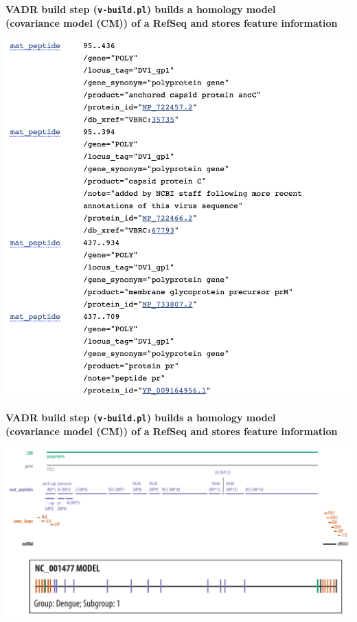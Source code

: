 \documentclass[landscape]{slides}
\begin{document}
\begin{slide}
\begin{center}
\textbf{VADR build step (\texttt{v-build.pl}) builds a homology model
  \\ (covariance model (CM)) of a RefSeq and stores feature information}

\includegraphics[width=6in]{figs/ss-001477-bot}

\end{center}
\vfill
\end{slide}
\begin{slide}
\begin{center}
\textbf{VADR build step (\texttt{v-build.pl}) builds a homology model
  \\ (covariance model (CM)) of a RefSeq and stores feature information}

\includegraphics[width=10.5in]{figs/dengue-features}

\end{center}
\vfill
\end{slide}
\end{document}
